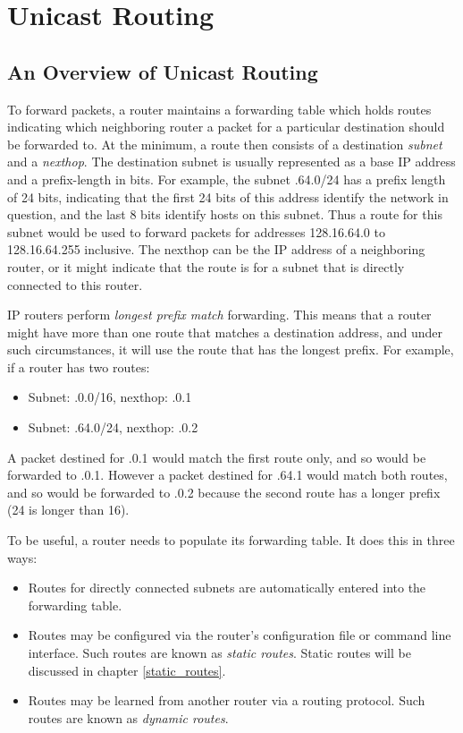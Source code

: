 %
%

\chapter{Unicast Routing}

\section{An Overview of Unicast Routing}

To forward packets, a router maintains a forwarding table which holds
routes indicating which neighboring router a packet for a particular
destination should be forwarded to.  At the minimum, a route then
consists of a destination {\it subnet} and a {\it nexthop}.  The destination
subnet is usually represented as a base IP address and a prefix-length
in bits.  For example, the subnet {.64.0/24} has a prefix
length of 24 bits, indicating that the first 24 bits of this address
identify the network in question, and the last 8 bits identify hosts
on this subnet.  Thus a route for this subnet would be used to forward
packets for addresses 128.16.64.0 to 128.16.64.255 inclusive.  The
nexthop can be the IP address of a neighboring router, or it might
indicate that the route is for a subnet that is directly connected to
this router.

IP routers perform {\it longest prefix match} forwarding.  This means
that a router might have more than one route that matches a
destination address, and under such circumstances, it will use the
route that has the longest prefix.   For example, if a router has two routes:
\begin{itemize}
\item Subnet: {.0.0/16}, nexthop: {.0.1}
\item Subnet: {.64.0/24}, nexthop: {.0.2}
\end{itemize}
\noindent A packet destined for {.0.1} would match the first
route only, and so would be forwarded to {.0.1}.  However a
packet destined for {.64.1} would match both routes, and so
would be forwarded to {.0.2} because the second route has a
longer prefix (24 is longer than 16).

To be useful, a router needs to populate its forwarding table.  It
does this in three ways:
\begin{itemize}
\item Routes for directly connected subnets are automatically entered into
the forwarding table.
\item Routes may be configured via the router's configuration file or
command line interface.  Such routes are known as {\it static
routes}. Static routes will be discussed in chapter \ref{static_routes}.
\item Routes may be learned from another router via a routing
protocol.  Such routes are known as {\it dynamic routes}.
\end{itemize}

